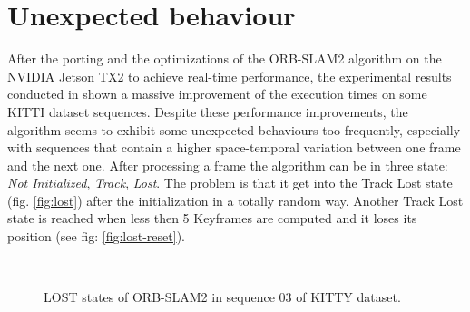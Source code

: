 

\section{Unexpected behaviour}
After the porting and the optimizations of the ORB-SLAM2 algorithm on the NVIDIA Jetson TX2 to achieve real-time performance, the experimental results conducted in \cite{iros2019} shown a massive improvement of the execution times on some KITTI dataset sequences.
Despite these performance improvements, the algorithm seems to exhibit some unexpected behaviours too frequently, especially with sequences that contain a higher space-temporal variation between one frame and the next one. After processing a frame the algorithm can be in three state: \textit{Not Initialized}, \textit{Track}, \textit{Lost}. The problem is that it get into the Track Lost state (fig. \ref{fig:lost}) after the initialization in a totally random way. Another Track Lost state is reached when less then 5 Keyframes are computed and it loses its position (see fig: \ref{fig:lost-reset}).

\begin{figure}[t]
	\centering
	\\
	\caption{LOST states of ORB-SLAM2 in sequence 03 of KITTY dataset.}
\end{figure}

